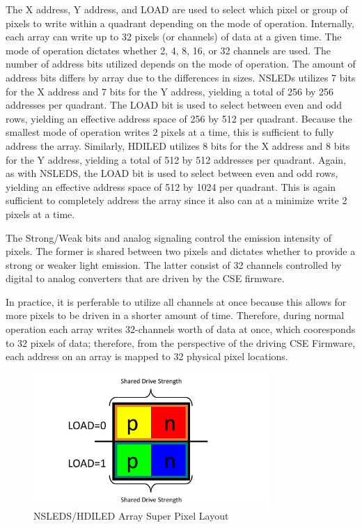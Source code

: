     The X address, Y address, and LOAD are used to select which pixel or group of pixels to write within a quadrant depending on the mode of operation.  Internally, each array can write up to 32 pixels (or channels) of data at a given time. The mode of operation dictates whether 2, 4, 8, 16, or 32 channels are used. The number of address bits utilized depends on the mode of operation. The amount of address bits differs by array due to the differences in sizes. NSLEDs utilizes 7 bits for the X address and 7 bits for the Y address, yielding a total of 256 by 256 addresses per quadrant. The LOAD bit is used to select between even and odd rows, yielding an effective address space of 256 by 512 per quadrant. Because the smallest mode of operation writes 2 pixels at a time, this is sufficient to fully address the array. Similarly, HDILED utilizes 8 bits for the X address and 8 bits for the Y address, yielding a total of 512 by 512 addresses per quadrant. Again, as with NSLEDS, the LOAD bit is used to select between even and odd rows, yielding an effective address space of 512 by 1024 per quadrant. This is again sufficient to completely address the array since it also can at a minimize write 2 pixels at a time.

    The Strong/Weak bits and analog signaling control the emission intensity of pixels. The former is shared between two pixels and dictates whether to provide a strong or weaker light emission. The latter consist of 32 channels controlled by digital to analog converters that are driven by the CSE firmware.

    In practice, it is perferable to utilize all channels at once because this allows for more pixels to be driven in a shorter amount of time. Therefore, during normal operation each array writes 32-channels worth of data at once, which cooresponds to 32 pixels of data; therefore, from the perspective of the driving CSE Firmware, each address on an array is mapped to 32 physical pixel locations.

    \begin{figure}
        \centering
        \includegraphics[trim=0in 0in 0in 0in,width=0.8\textwidth]{fig/superpixel_layout.pdf}
        \caption{NSLEDS/HDILED Array Super Pixel Layout}
        \label{fig:nsleds_hdiled_array_superpixel_layout}
    \end{figure}


